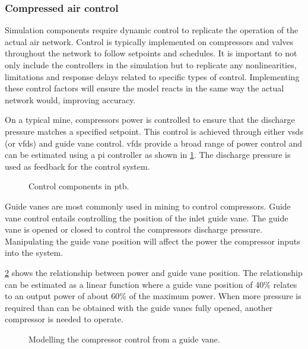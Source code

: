 		\subsubsection{Compressed air control}\label{Controllers}
			Simulation components require dynamic control to replicate the operation of the actual air network. Control is typically implemented on compressors and valves throughout the network to follow setpoints and schedules. It is important to not only include the controllers in the simulation but to replicate any nonlinearities, limitations and response delays related to specific types of control. Implementing these control factors will ensure the model reacts in the same way the actual network would, improving accuracy.
			\par 
			On a typical mine, compressors power is controlled to ensure that the discharge pressure matches a specified setpoint. This control is achieved through either \glspl{vsd} (or \glspl{vfd}) and guide vane control. \glspl{vfd} provide a broad range of power control and can be estimated using a \gls{pi} controller as shown in \cref{fig: Controller models}. The discharge pressure is used as feedback for the control system. 
			
	\begin{figure}[h]
		\centering
		\caption[Control components in Process toolbox]{Control components in \gls{ptb}.}
		\label{fig: Controller models}
	\end{figure}
		Guide vanes are most commonly used in mining to control compressors. Guide vane control entails controlling the position of the inlet guide vane. The guide vane is opened or closed to control the compressors discharge pressure. Manipulating the guide vane position will affect the power the compressor inputs into the system. 
		\par 
		\cref{fig: Guide vane position} shows the relationship between power and guide vane position. The relationship can be estimated as a linear function where a guide vane position of 40\% relates to an output power of about 60\% of the maximum power. When more pressure is required than can be obtained with the guide vanes fully opened, another compressor is needed to operate. 
		\begin{figure}[h]
			\centering
			\fbox{}
			\caption{Modelling the compressor control from a guide vane\protect \footnotemark[1].}
			\label{fig: Guide vane position}
		\end{figure}
	
